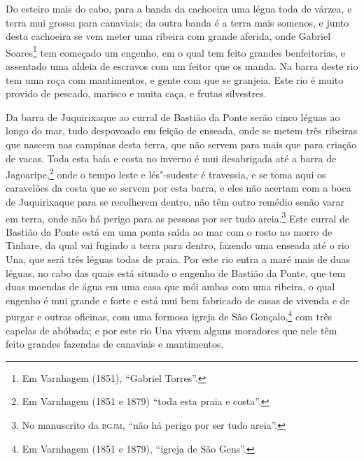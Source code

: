\begin{linenumbers}
Do esteiro mais do cabo, para a banda da cachoeira uma légua toda de várzea, e terra mui
grossa para canaviais; da outra banda é a terra mais somenos, e junto desta cachoeira se
vem meter uma ribeira com grande aferida, onde Gabriel Soares\footnote{ Em Varnhagem
(1851), ``Gabriel Torres''.} tem começado um engenho, em o qual tem feito grandes
benfeitorias, e assentado uma aldeia de escravos com um feitor que os manda. Na barra
deste rio tem uma roça com mantimentos, e gente com que se granjeia. Este rio é muito
provido de pescado, marisco e muita caça, e frutas silvestres.

Da barra de Juquirixaque ao curral de Bastião da Ponte serão cinco léguas ao longo do mar,
tudo despovoado em feição de enseada, onde se metem três ribeiras que nascem nas campinas
desta terra, que não servem para mais que para criação de vacas. Toda esta baía e costa no
inverno é mui desabrigada até a barra de Jagoaripe,\footnote{ Em Varnhagem (1851 e 1879)
``toda esta praia e costa''.} onde o tempo leste e lés"-sudeste é travessia, e se toma
aqui os caravelões da costa que se servem por esta barra, e eles não acertam com a boca de
Juquirixaque para se recolherem dentro, não têm outro remédio senão varar em terra, onde
não há perigo para as pessoas por ser tudo areia.\footnote{ No manuscrito da
\textsc{bgjm}, ``não há perigo por ser tudo areia''.} Este curral de Bastião da Ponte
está em uma ponta saída ao mar com o rosto no morro de Tinhare, da qual vai fugindo a
terra para dentro, fazendo uma enseada até o rio Una, que será três léguas todas de praia.
Por este rio entra a maré mais de duas léguas, no cabo das quais está situado o engenho de
Bastião da Ponte, que tem duas moendas de água em uma casa que mói ambas com uma ribeira,
o qual engenho é mui grande e forte e está mui bem fabricado de casas de vivenda e de
purgar e outras oficinas, com uma formosa igreja de São Gonçalo,\footnote{ Em Varnhagem
(1851 e 1879), ``igreja de São Gens''.} com três capelas de abóbada; e por este rio Una
vivem alguns moradores que nele têm feito grandes fazendas de canaviais e mantimentos.


\end{linenumbers}

